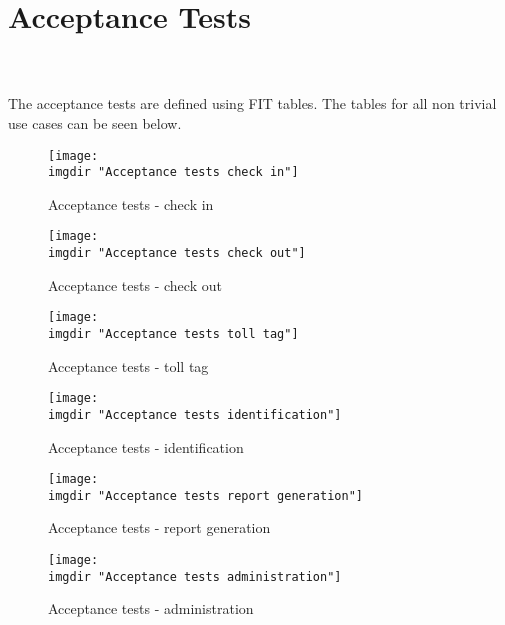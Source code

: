 \chapter{Acceptance Tests}
\martin \pawel \\\\
The acceptance tests are defined using FIT tables. The tables for all non trivial use cases can be seen below.

\begin{figure}[H]
\texttt{[image: \\imgdir "Acceptance tests check in"]}
\centering
\caption{Acceptance tests - check in}
\label{fig:acceptance_tests_check_in}
\end{figure}

\begin{figure}[H]
\texttt{[image: \\imgdir "Acceptance tests check out"]}
\centering
\caption{Acceptance tests - check out}
\label{fig:acceptance_tests_check_out}
\end{figure}

\begin{figure}[H]
\texttt{[image: \\imgdir "Acceptance tests toll tag"]}
\centering
\caption{Acceptance tests - toll tag}
\label{fig:acceptance_tests_toll_tag}
\end{figure}

\begin{figure}[H]
\texttt{[image: \\imgdir "Acceptance tests identification"]}
\centering
\caption{Acceptance tests - identification}
\label{fig:acceptance_tests_identification}
\end{figure}

\begin{figure}[H]
\texttt{[image: \\imgdir "Acceptance tests report generation"]}
\centering
\caption{Acceptance tests - report generation}
\label{fig:acceptance_tests_report_generation}
\end{figure}

\begin{figure}[H]
\texttt{[image: \\imgdir "Acceptance tests administration"]}
\centering
\caption{Acceptance tests - administration}
\label{fig:acceptance_tests_administration}
\end{figure}